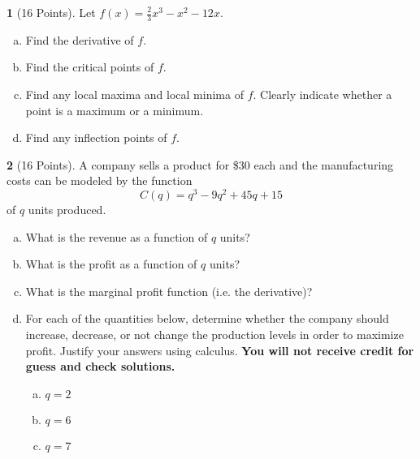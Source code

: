 \documentclass[12pt]{amsart}
\theoremstyle{definition}
\newtheorem{thm}{}
\theoremstyle{definition}
\begin{document}
\newpage
\begin{thm}[16 Points]
  Let $f(x) = \frac{2}{3}x^3 - x^2 - 12x$.
    \begin{enumerate}[(a)]
  \item
    Find the derivative of $f$.
    \vspace{1in}
  \item
    Find the critical points of $f$.
    \vspace{2in}
  \item
    Find any local maxima and local minima of $f$.
    Clearly indicate whether a point is a maximum or a minimum.
    \vspace{2in}
  \item
    Find any inflection points of $f$.
  \end{enumerate}
\end{thm}

\newpage
\begin{thm}[16 Points]
  A company sells a product for \$30 each and the manufacturing costs can be modeled by the function
  $$C(q) = q^3 - 9q^2 + 45q + 15$$
  of $q$ units produced.
  \begin{enumerate}[(a)]
  \item
    What is the revenue as a function of $q$ units?
    \vspace{1in}
  \item
    What is the profit as a function of $q$ units?
    \vspace{1in}
  \item
    What is the marginal profit function (i.e. the derivative)?
    \vspace{1in}
  \item
      For each of the quantities below, determine whether the company should increase, decrease, or not change the production levels in order to maximize profit.
  Justify your answers using calculus.
  {\bf You will not receive credit for guess and check solutions.}
  \begin{multicols}{3}
  \begin{enumerate}[(a)]
    \item
      $q = 2$
    \item
      $q = 6$
    \item
      $q = 7$
    \end{enumerate}
  \end{multicols}
  \end{enumerate}
\end{thm}
\end{document}
